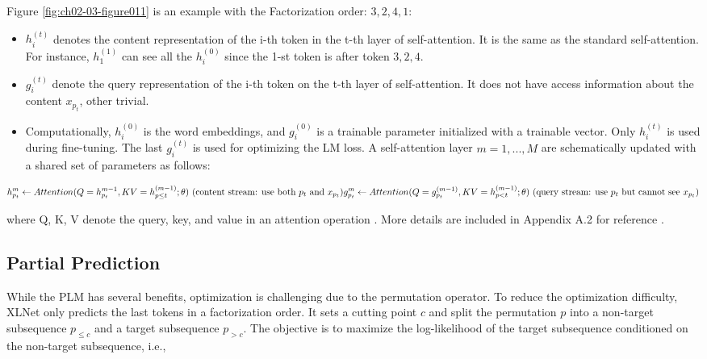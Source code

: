 \documentclass[]{krantz}
\begin{document}
Figure \ref{fig:ch02-03-figure011} is an example with the Factorization order: \(3,2,4,1\):

\begin{itemize}
\item
  \(h_i^{(t)}\) denotes the content representation of the i-th token in the t-th layer of self-attention. It is the same as the standard self-attention. For instance, \(h_1^{(1)}\) can see all the \(h_i^{(0)}\) since the 1-st token is after token \({3,2,4}\).
\item
  \(g_i^{(t)}\) denote the query representation of the i-th token on the t-th layer of self-attention. It does not have access information about the content \(x_{p_t}\), other trivial.
\item
  Computationally, \(h_i^{(0)}\) is the word embeddings, and \(g_i^{(0)}\) is a trainable parameter initialized with a trainable vector. Only \(h_i^{(t)}\) is used during fine-tuning. The last \(g_i^{(t)}\) is used for optimizing the LM loss. A self-attention layer \(m=1,...,M\) are schematically updated with a shared set of parameters as follows:
\end{itemize}

\[
h_{p_t}^{m} \leftarrow Attention (Q=h_{p_t}^{m-1}, KV=h^{(m-1)}_{p \leq t};\theta)
\text{  (content stream: use both $p_t$ and $x_{p_t}$)}
\\
g_{p_t}^{m}\leftarrow Attention (Q=g_{p_t}^{(m-1)}, KV=h^{(m-1)}_{p<t};\theta)
\text{  (query stream: use $p_t$ but cannot see }x_{p_t})
\]

where Q, K, V denote the query, key, and value in an attention operation \citet{vaswani2017attention}.
More details are included in Appendix A.2 for reference \citet{yang2019xlnet}.

\hypertarget{partial-prediction}{%
\subsection{Partial Prediction}\label{partial-prediction}}

While the PLM has several benefits, optimization is challenging due to the permutation operator. To reduce the optimization difficulty, XLNet only predicts the last tokens in a factorization order. It sets a cutting point \(c\) and split the permutation \(p\) into a non-target subsequence \(p_{\leq c}\) and a target subsequence \(p_{>c}\). The objective is to maximize the log-likelihood of the target subsequence conditioned on the non-target subsequence, i.e.,
\end{document}
